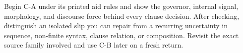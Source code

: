   Begin C-A under its printed aid rules and show the governor, internal signal,
  morphology, and discourse force behind every clause decision. After checking,
  distinguish an isolated slip you can repair from a recurring uncertainty in
  sequence, non-finite syntax, clause relation, or composition. Revisit the
  exact source family involved and use C-B later on a fresh return.

